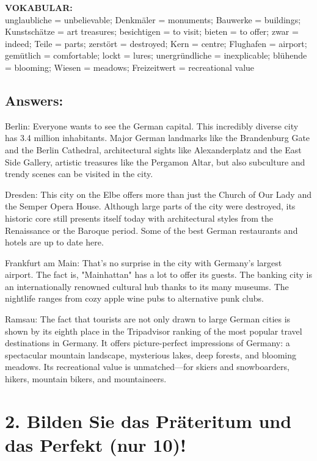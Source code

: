 \documentclass[12pt]{article}
\begin{document}
\textbf{VOKABULAR:} \\
unglaubliche = unbelievable; Denkmäler = monuments; Bauwerke = buildings; Kunstschätze = art treasures; besichtigen = to visit; bieten = to offer; zwar = indeed; Teile = parts; zerstört = destroyed; Kern = centre; Flughafen = airport; gemütlich = comfortable; lockt = lures; unergründliche = inexplicable; blühende = blooming; Wiesen = meadows; Freizeitwert = recreational value

\subsection*{Answers:}

Berlin: Everyone wants to see the German capital. This incredibly diverse city has 3.4 million inhabitants. Major German landmarks like the Brandenburg Gate and the Berlin Cathedral, architectural sights like Alexanderplatz and the East Side Gallery, artistic treasures like the Pergamon Altar, but also subculture and trendy scenes can be visited in the city.

Dresden: This city on the Elbe offers more than just the Church of Our Lady and the Semper Opera House. Although large parts of the city were destroyed, its historic core still presents itself today with architectural styles from the Renaissance or the Baroque period. Some of the best German restaurants and hotels are up to date here.

Frankfurt am Main: That’s no surprise in the city with Germany’s largest airport. The fact is, "Mainhattan" has a lot to offer its guests. The banking city is an internationally renowned cultural hub thanks to its many museums. The nightlife ranges from cozy apple wine pubs to alternative punk clubs.

Ramsau: The fact that tourists are not only drawn to large German cities is shown by its eighth place in the Tripadvisor ranking of the most popular travel destinations in Germany. It offers picture-perfect impressions of Germany: a spectacular mountain landscape, mysterious lakes, deep forests, and blooming meadows. Its recreational value is unmatched—for skiers and snowboarders, hikers, mountain bikers, and mountaineers.


\vspace{1em}

\section*{2. Bilden Sie das Präteritum und das Perfekt (nur 10)!}
\end{document}
